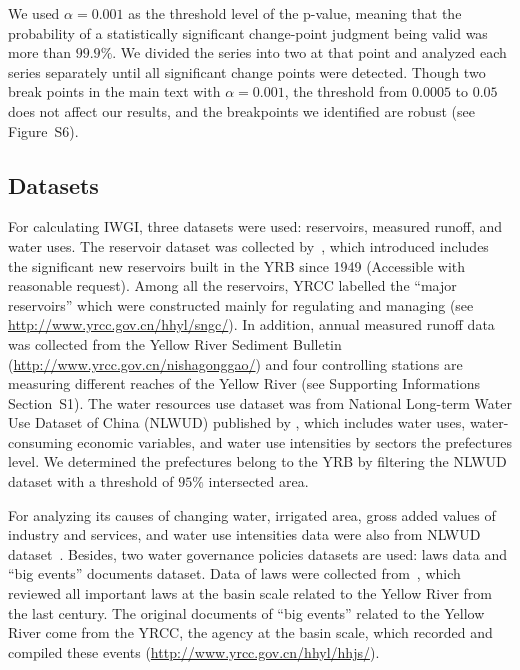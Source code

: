 \documentclass[draft]{../agujournal2019}
\begin{document}
We used $\alpha = 0.001$ as the threshold level of the p-value, meaning that the probability of a statistically significant change-point judgment being valid was more than $99.9\%$. We divided the series into two at that point and analyzed each series separately until all significant change points were detected. Though two break points in the main text with $\alpha = 0.001$, the threshold from $0.0005$ to $0.05$ does not affect our results, and the breakpoints we identified are robust (see Figure~S6).

	\subsection{Datasets}\label{sec:datasets}

	For calculating IWGI, three datasets were used: reservoirs, measured runoff, and water uses.
	The reservoir dataset was collected by~, which introduced includes the significant new reservoirs built in the YRB since 1949 (Accessible with reasonable request).
	Among all the reservoirs, YRCC labelled the ``major reservoirs'' which were constructed mainly for regulating and managing (see \url{http://www.yrcc.gov.cn/hhyl/sngc/}).
	In addition, annual measured runoff data was collected from the Yellow River Sediment Bulletin (\url{http://www.yrcc.gov.cn/nishagonggao/}) and four controlling stations are measuring different reaches of the Yellow River (see Supporting Informations Section~S1).
	The water resources use dataset was from National Long-term Water Use Dataset of China (NLWUD) published by , which includes water uses, water-consuming economic variables, and water use intensities by sectors the prefectures level.
	We determined the prefectures belong to the YRB by filtering the NLWUD dataset with a threshold of $95\%$ intersected area.

	For analyzing its causes of changing water, irrigated area, gross added values of industry and services, and water use intensities data were also from NLWUD dataset~\cite{zhou2020}.
	Besides, two water governance policies datasets are used: laws data and ``big events'' documents dataset.
	Data of laws were collected from~, which reviewed all important laws at the basin scale related to the Yellow River from the last century.
	The original documents of ``big events'' related to the Yellow River come from the YRCC, the agency at the basin scale, which recorded and compiled these events (\url{http://www.yrcc.gov.cn/hhyl/hhjs/}).
\end{document}
